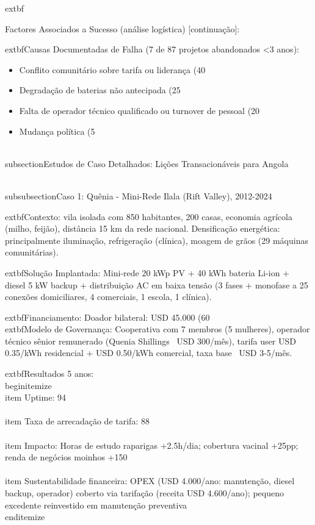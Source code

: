 \documentclass[12pt, a4paper]{article}
\begin{document}
	extbf{Factores Associados a Sucesso (análise logística) [continuação]:

	extbf{Causas Documentadas de Falha (7 de 87 projetos abandonados <3 anos):}
\begin{itemize}
\item Conflito comunitário sobre tarifa ou liderança (40\\%
\item Degradação de baterias não antecipada (25\\%
\item Falta de operador técnico qualificado ou turnover de pessoal (20\\%
\item Mudança política (5\\%
\end{itemize}

\\subsection{Estudos de Caso Detalhados: Lições Transacionáveis para Angola}

\\subsubsection{Caso 1: Quênia - Mini-Rede Ilala (Rift Valley), 2012-2024}

	extbf{Contexto:} vila isolada com 850 habitantes, 200 casas, economia agrícola (milho, feijão), distância 15 km da rede nacional. Densificação energética: principalmente iluminação, refrigeração (clínica), moagem de grãos (29 máquinas comunitárias).

	extbf{Solução Implantada:} Mini-rede 20 kWp PV + 40 kWh bateria Li-ion + diesel 5 kW backup + distribuição AC em baixa tensão (3 fases + monofase a 25 conexões domiciliares, 4 comerciais, 1 escola, 1 clínica).

	extbf{Financiamento:} Doador bilateral: USD 45.000 (60\\%

	extbf{Modelo de Governança:} Cooperativa com 7 membros (5 mulheres), operador técnico sênior remunerado (Quenia Shillings ~USD 300/mês), tarifa user USD 0.35/kWh residencial + USD 0.50/kWh comercial, taxa base ~USD 3-5/mês.

	extbf{Resultados 5 anos:}
\\begin{itemize}
\\item Uptime: 94\\%
\\item Taxa de arrecadação de tarifa: 88\\%
\\item Impacto: Horas de estudo raparigas +2.5h/dia; cobertura vacinal +25pp; renda de negócios moinhos +150\\%
\\item Sustentabilidade financeira: OPEX (USD 4.000/ano: manutenção, diesel backup, operador) coberto via tarifação (receita USD 4.600/ano); pequeno excedente reinvestido em manutenção preventiva
\\end{itemize}

}
\end{document}
